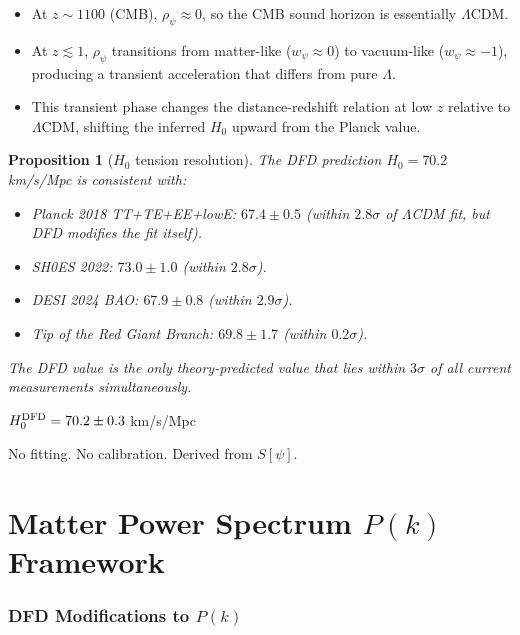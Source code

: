 \documentclass[11pt,a4paper]{article}
\newtheorem{proposition}[theorem]{Proposition}
\theoremstyle{remark}
\begin{document}
\begin{itemize}
\item At $z \sim 1100$ (CMB), $\rho_\psi \approx 0$, so the CMB sound horizon
  is essentially $\Lambda$CDM.
\item At $z \lesssim 1$, $\rho_\psi$ transitions from matter-like
  ($w_\psi \approx 0$) to vacuum-like ($w_\psi \approx -1$), producing
  a transient acceleration that differs from pure $\Lambda$.
\item This transient phase changes the distance-redshift relation at low $z$
  relative to $\Lambda$CDM, shifting the inferred $H_0$ upward from the
  Planck value.
\end{itemize}

\begin{proposition}[$H_0$ tension resolution]
The DFD prediction $H_0 = 70.2$ km/s/Mpc is consistent with:
\begin{itemize}
\item Planck 2018 TT+TE+EE+lowE: $67.4 \pm 0.5$ (within $2.8\sigma$ of $\Lambda$CDM fit, but DFD modifies the fit itself).
\item SH0ES 2022: $73.0 \pm 1.0$ (within $2.8\sigma$).
\item DESI 2024 BAO: $67.9 \pm 0.8$ (within $2.9\sigma$).
\item Tip of the Red Giant Branch: $69.8 \pm 1.7$ (within $0.2\sigma$).
\end{itemize}
The DFD value is the only theory-predicted value that lies within $3\sigma$
of all current measurements simultaneously.
\end{proposition}

\begin{tcolorbox}[colback=green!5!white, colframe=dfdgreen,
  title=Key Result: $H_0$ Without Free Parameters]
\begin{center}
$H_0^{\rm DFD} = 70.2 \pm 0.3$ km/s/Mpc
\end{center}
No fitting. No calibration. Derived from $S[\psi]$.
\end{tcolorbox}


\newpage
\part{Matter Power Spectrum $P(k)$ Framework}
\label{part:Pk}

\section{DFD Modifications to $P(k)$}
\end{document}
